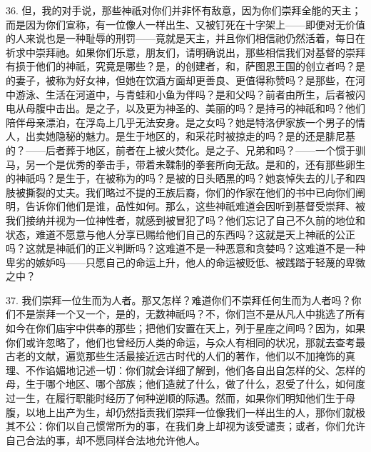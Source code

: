 36. 但，我的对手说，那些神祇对你们并非怀有敌意，因为你们崇拜全能的天主；而是因为你们宣称，有一位像人一样出生、又被钉死在十字架上——即便对无价值的人来说也是一种耻辱的刑罚——竟就是天主，并且你们相信祂仍然活着，每日在祈求中崇拜祂。如果你们乐意，朋友们，请明确说出，那些相信我们对基督的崇拜有损于他们的神祇，究竟是哪些？是，的创建者，和，萨图恩王国的创立者吗？是的妻子，被称为好女神，但她在饮酒方面却更善良、更值得称赞吗？是那些，在河中游泳、生活在河道中，与青蛙和小鱼为伴吗？是和父吗？前者由所生，后者被闪电从母腹中击出。是之子，以及更为神圣的、美丽的吗？是持弓的神祇和吗？他们陪伴母亲漂泊，在浮岛上几乎无法安身。是之女吗？她是特洛伊家族一个男子的情人，出卖她隐秘的魅力。是生于地区的，和采花时被掠走的吗？是的还是腓尼基的？——后者葬于地区，前者在上被火焚化。是之子、兄弟和吗？——一个惯于驯马，另一个是优秀的拳击手，带着未鞣制的拳套所向无敌。是和的，还有那些卵生的神祇吗？是生于，在被称为的吗？是被的日头晒黑的吗？她哀悼失去的儿子和四肢被撕裂的丈夫。我们略过不提的王族后裔，你们的作家在他们的书中已向你们阐明，告诉你们他们是谁，品性如何。那么，这些神祇难道会因听到基督受崇拜、被我们接纳并视为一位神性者，就感到被冒犯了吗？他们忘记了自己不久前的地位和状态，难道不愿意与他人分享已赐给他们自己的东西吗？这就是天上神祇的公正吗？这就是神祇们的正义判断吗？这难道不是一种恶意和贪婪吗？这难道不是一种卑劣的嫉妒吗——只愿自己的命运上升，他人的命运被贬低、被践踏于轻蔑的卑微之中？\par

37. 我们崇拜一位生而为人者。那又怎样？难道你们不崇拜任何生而为人者吗？你们不是崇拜一个又一个，是的，无数神祇吗？不，你们岂不是从凡人中挑选了所有如今在你们庙宇中供奉的那些；把他们安置在天上，列于星座之间吗？因为，如果你们或许忽略了，他们也曾经历人类的命运，与众人有相同的状况，那就去查考最古老的文献，遍览那些生活最接近远古时代的人们的著作，他们以不加掩饰的真理、不作谄媚地记述一切：你们就会详细了解到，他们各自出自怎样的父、怎样的母，生于哪个地区、哪个部族；他们造就了什么，做了什么，忍受了什么，如何度过一生，在履行职能时经历了何种逆顺的际遇。然而，如果你们明知他们生于母腹，以地上出产为生，却仍然指责我们崇拜一位像我们一样出生的人，那你们就极其不公：你们以自己惯常所为的事，在我们身上却视为该受谴责；或者，你们允许自己合法的事，却不愿同样合法地允许他人。\par

